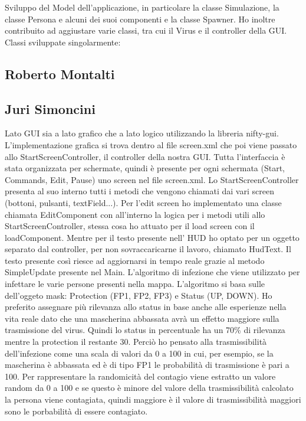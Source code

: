 Sviluppo del Model dell'applicazione, in particolare la classe Simulazione, la classe Persona e alcuni dei suoi componenti e la classe Spawner. Ho inoltre contribuito ad aggiustare varie classi, tra cui il Virus e il controller della GUI.
Classi sviluppate singolarmente:

\subsection{Roberto Montalti}

\subsection{Juri Simoncini}
Lato GUI sia a lato grafico che a lato logico utilizzando la libreria nifty-gui.
L'implementazione grafica si trova dentro al file screen.xml che poi viene passato allo StartScreenController, il controller della nostra GUI.
Tutta l'interfaccia è stata organizzata per schermate, quindi è presente per ogni schermata (Start, Commands, Edit, Pause) uno screen nel file screen.xml.
Lo StartScreenController presenta al suo interno tutti i metodi che vengono chiamati dai vari screen (bottoni, pulsanti, textField...).
Per l'edit screen ho implementato una classe chiamata EditComponent con all'interno la logica per i metodi utili allo StartScreenController, stessa cosa ho attuato per il load screen con il loadComponent.
Mentre per il testo presente nell' HUD ho optato per un oggetto separato dal controller, per non sovraccaricarne il lavoro, chiamato HudText.
Il testo presente così riesce ad aggiornarsi in tempo reale grazie al metodo SimpleUpdate presente nel Main.
L'algoritmo di infezione che viene utilizzato per infettare le varie persone presenti nella mappa.
L'algoritmo si basa sulle dell'oggeto mask: Protection (FP1, FP2, FP3) e Status (UP, DOWN).
Ho preferito assegnare più rilevanza allo status in base anche alle esperienze nella vita reale dato che una mascherina abbassata avrà un effetto maggiore sulla trasmissione del virus.
Quindi lo status in percentuale ha un 70\% di rilevanza mentre la protection il restante 30.
Perciò ho pensato alla trasmissibilità dell'infezione come una scala di valori da 0 a 100 in cui, per esempio, se la mascherina è abbassata ed è di tipo FP1 le probabilità di trasmissione è pari a 100.
Per rappresentare la randomicità del contagio viene estratto un valore random da 0 a 100 e se questo è minore del valore della trasmissibilità calcolato la persona viene contagiata, quindi maggiore è il valore di trasmissibilità maggiori sono le porbabilità di essere contagiato.

